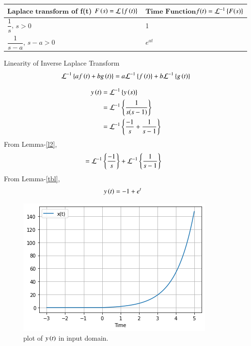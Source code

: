 \documentclass[journal,12pt,twocolumn]{IEEEtran}
\begin{document}
\begin{lemma}\label{tbl}
\begin{center}
\begin{tabular}{ |m{3cm}|m{4.5cm}| } 
 \hline
 $\textbf{Laplace transform}$ of f(t) $F\left(s\right)=\mathcal{L}\left\{f\left(t\right)\right\}$  & $\textbf{Time Function}$$ f(t)=\mathcal{L}^{-1}\left\{F(s)\right\}$ \\ 
 \hline
 $\dfrac{1}{s}$, $s>0$ &1 \\ 
 \hline
 $\dfrac{1}{s-a}$, $s-a>0$ & $e^{at}$\\
 \hline
\end{tabular}
\end{center}
\end{lemma}

\begin{lemma}{Linearity of Inverse Laplace Transform} \label{l2}
\begin{align}
    \mathcal{L}^{-1}\left\{af\left(t\right)+bg\left(t\right)\right\}=a\mathcal{L}^{-1}\left\{f\left(t\right)\right\}+b\mathcal{L}^{-1}\left\{g\left(t\right)\right\}
\end{align}
\end{lemma}

\begin{align}
    y\left(t\right)&= \mathcal{L}^{-1}\left\{y\left(s\right)\right\}\\
    &= \mathcal{L}^{-1}\left\{\dfrac{1}{s(s-1)}\right\}\\
     &= \mathcal{L}^{-1}\left\{\dfrac{-1}{s} + \dfrac{1}{s-1}\right\}
\end{align}
From Lemma-\ref{l2},
\begin{align}
    &= \mathcal{L}^{-1}\left\{\dfrac{-1}{s}\right\} +  \mathcal{L}^{-1}\left\{
    \dfrac{1}{s-1}\right\}
\end{align}
From Lemma-\ref{tbl},
\begin{align}
     y\left(t\right)&= -1 + e^{t}
\end{align}
\begin{figure}[!h]
 \centering
 \includegraphics[width=\columnwidth]{fig_2.png}
 \caption{plot of $y\left(t\right)$ in input domain.}
\end{figure}
\end{document}
